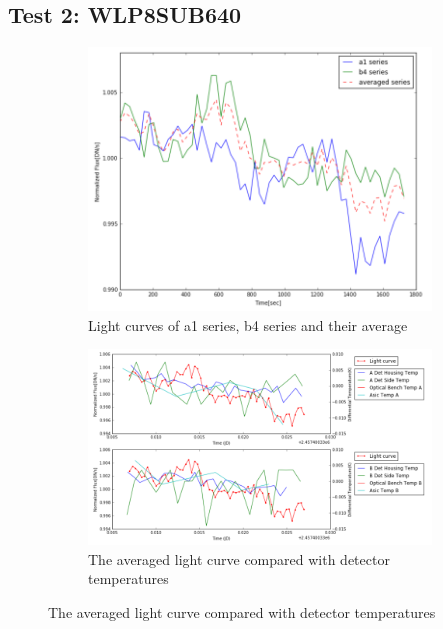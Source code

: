 \documentclass{aastex6}
\begin{document}
\subsection{Test 2: WLP8SUB640} 
\begin{figure}[H]
    \centering
    \begin{subfigure}{1}
        \includegraphics[scale=0.4]{ts_test2}
        \caption{Light curves of a1 series, b4 series and their average}
    \end{subfigure}

    \begin{subfigure}{2}
        \includegraphics[scale=0.4]{temp_test2}
        \caption{The averaged light curve compared with detector temperatures}
    \end{subfigure}
   

\end{figure}
\end{document}
